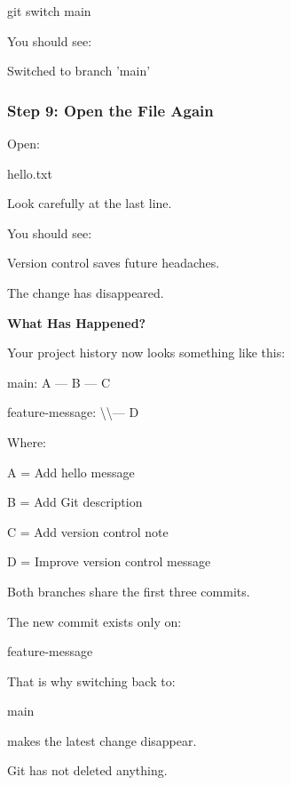 \documentclass{csc2059practical}
\begin{document}
\begin{terminalplain}
git switch main
\end{terminalplain}
You should see:

\begin{terminalplain}
Switched to branch 'main'
\end{terminalplain}
\subsubsection{Step 9: Open the File Again}
Open:

\begin{terminalplain}
hello.txt
\end{terminalplain}
Look carefully at the last line.

You should see:

\begin{terminalplain}
Version control saves future headaches.
\end{terminalplain}
The change has disappeared.

\begin{commonerror}
\textbf{What Has Happened?}\par
\medskip

Your project history now looks something like this:


\end{commonerror}
\begin{terminalplain}
main: A --- B --- C
\end{terminalplain}
\begin{terminalplain}
feature-message: \textbackslash{}\textbackslash{}--- D
\end{terminalplain}
Where:

A = Add hello message

B = Add Git description

C = Add version control note

D = Improve version control message

Both branches share the first three commits.

The new commit exists only on:

feature-message

That is why switching back to:

main

\begin{terminalplain}
makes the latest change disappear.
\end{terminalplain}
Git has not deleted anything.
\end{document}
